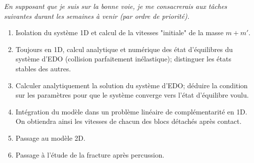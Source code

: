 \documentclass[
  french,
	11pt, %
]{fphw}
\begin{document}
\textit{En supposant que je suis sur la bonne voie, je me consacrerais aux tâches suivantes durant les semaines à venir (par ordre de priorité).}
\begin{enumerate}
  \item Isolation du système 1D et calcul de la vitesses "initiale" de la masse $m+m'$.
  \item Toujours en 1D, calcul analytique et numérique des état d'équilibres du système d'EDO (collision parfaitement inélastique); distinguer les états stables des autres.
  \item Calculer analytiquement la solution du système d'EDO; déduire la condition sur les paramètres pour que le système converge vers l'état d'équilibre voulu.
  \item Intégration du modèle dans un problème linéaire de complémentarité en 1D. On obtiendra ainsi les vitesses de chacun des blocs détachés après contact.
  \item Passage au modèle 2D.
  \item Passage à l'étude de la fracture après percussion.
\end{enumerate}



\clearpage   %
\printbibliography
\end{document}
